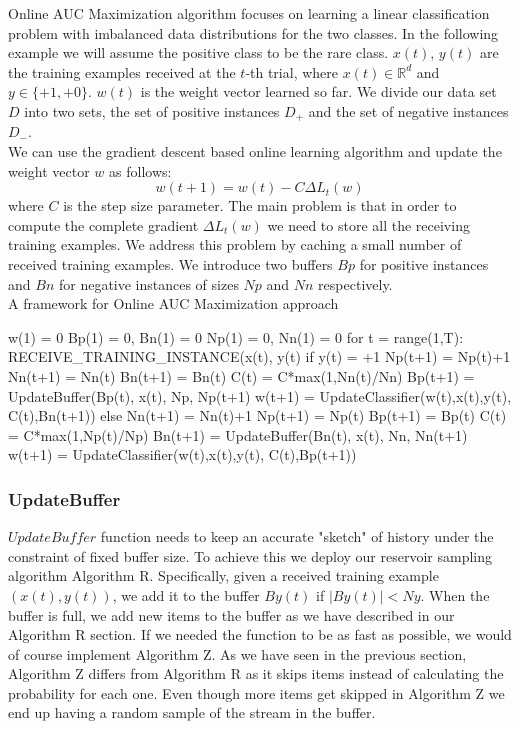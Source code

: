 \documentclass[journal]{IEEEtran/IEEEtran}
\begin{document}
Online AUC Maximization algorithm focuses on learning a linear classification problem with imbalanced data distributions for the two classes. In the following example we will assume the positive class to be the rare class. $x(t)$, $y(t)$ are the training examples received at the $t$-th trial, where $x(t) \in  \mathbb{R}^d $ and $y \in \{+1, +0\}$. $w(t)$ is the weight vector learned so far. We divide our data set $D$ into two sets, the set of positive instances $D_+$ and the set of negative instances $D_-$.\\

We can use the gradient descent based online learning algorithm and update the weight vector $w$ as follows:
\[ w(t+1) = w(t) - C\Delta L_t(w) \]
where $C$ is the step size parameter. The main problem is that in order to compute the complete gradient $\Delta L_t(w)$ we need to store all the receiving training examples. We address this problem by caching a small number of received training examples. We introduce two buffers $Bp$ for positive instances and $Bn$ for negative instances of sizes $Np$ and $Nn$ respectively. \\

A framework for Online AUC Maximization approach
\begin{code}
w(1) = 0
Bp(1) = 0, Bn(1) = 0
Np(1) = 0, Nn(1) = 0
for t = range(1,T):
  RECEIVE_TRAINING_INSTANCE(x(t), y(t)
  if y(t) = +1
    Np(t+1) = Np(t)+1
    Nn(t+1) = Nn(t)
    Bn(t+1) = Bn(t)
    C(t) = C*max(1,Nn(t)/Nn)
    Bp(t+1) = 
      UpdateBuffer(Bp(t), x(t), Np, Np(t+1)
    w(t+1)  = 
      UpdateClassifier(w(t),x(t),y(t),
                       C(t),Bn(t+1))
  else
    Nn(t+1) = Nn(t)+1
    Np(t+1) = Np(t)
    Bp(t+1) = Bp(t)
    C(t) = C*max(1,Np(t)/Np)
    Bn(t+1) = 
      UpdateBuffer(Bn(t), x(t), Nn, Nn(t+1)
    w(t+1)  = 
      UpdateClassifier(w(t),x(t),y(t),
                       C(t),Bp(t+1))
\end{code}
\subsubsection*{UpdateBuffer}
$UpdateBuffer$ function needs to keep an accurate "sketch" of history under the constraint of fixed buffer size. To achieve this we deploy our reservoir sampling algorithm Algorithm R. Specifically, given a received training example $(x(t), y(t))$, we add it to the buffer $By(t)$ if $| By(t) | < Ny$. When the buffer is full, we add new items to the buffer as we have described in our Algorithm R section. If we needed the function to be as fast as possible, we would of course implement Algorithm Z. As we have seen in the previous section, Algorithm Z differs from Algorithm R as it skips items instead of calculating the probability for each one. Even though more items get skipped in Algorithm Z we end up having a random sample of the stream in the buffer.
\end{document}
